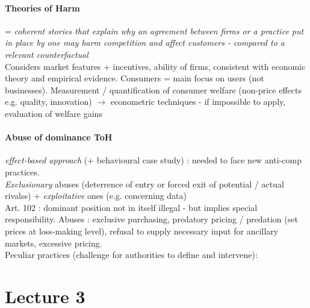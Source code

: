 \documentclass[10pt]{article}
\begin{document}
\paragraph{Theories of Harm} = \textit{coherent stories that explain why an agreement between firms or a practice put in place by one may harm competition and affect customers - compared to a relevant counterfactual}
\\Considers market features + incentives, ability of firms, consistent with economic theory and empirical evidence. Consumers = main focus on users (not businesses). Measurement / quantification of consumer welfare (non-price effects e.g. quality, innovation) $\rightarrow$ econometric techniques - if impossible to apply, evaluation of welfare gains

\paragraph{Abuse of dominance ToH} \textit{effect-based approach} (+ behavioural case study) : needed to face new anti-comp practices.
\\\textit{Exclusionary} abuses (deterrence of entry or forced exit of potential / actual rivalss) + \textit{exploitative} ones (e.g. concerning data)
\\Art. 102 : dominant position not in itself illegal - but implies special responsibility. Abuses : exclusive purchasing, predatory pricing / predation (set prices at loss-making level), refusal to supply necessary input for ancillary markets, excessive pricing.
\\Peculiar practices (challenge for authorities to define and intervene):

\section{Lecture 3}
\end{document}
